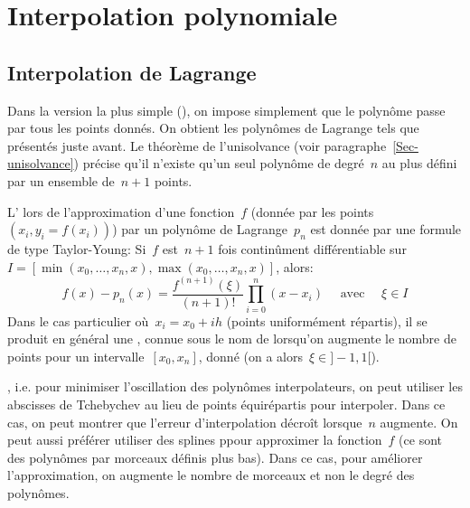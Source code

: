 \section{Interpolation polynomiale} 
\subsection{Interpolation de Lagrange} 
Dans la version la plus simple (), on impose simplement que le polynôme passe par tous les points donnés. On obtient les polynômes de Lagrange tels que présentés juste avant.  Le théorème de l'unisolvance (voir paragraphe~\ref{Sec-unisolvance}) précise qu'il n'existe qu'un seul polynôme de degré~$n$ au plus défini par un ensemble de~$n+1$ points. 

L' lors de l'approximation d'une fonction~$f$ (donnée par les points~$(x_i,y_i=f(x_i))$) par un polynôme de Lagrange~$p_n$ est donnée par une formule de type Taylor-Young: Si~$f$ est~$n+1$ fois continûment différentiable sur~$I=[\min(x_0,\ldots,x_n,x),\max(x_0,\ldots,x_n,x)]$, alors:
\begin{equation}
f(x) - p_n(x) = \frac{f^{(n+1)}(\xi)}{(n+1)!} \prod_{i=0}^n (x-x_i) \quad \text{ avec }\quad \xi \in I
\end{equation}
Dans le cas particulier où~$x_i = x_0 + ih$ (points uniformément répartis), il se produit en général une , connue sous le nom de  lorsqu'on augmente le nombre de points pour un intervalle~$[x_0,x_n]$, donné (on a alors~$\xi\in]-1,1[$). 

, i.e. pour minimiser l'oscillation des polynômes interpolateurs, on peut utiliser les abscisses de Tchebychev au lieu de points équirépartis pour interpoler. Dans ce cas, on peut montrer que l'erreur d'interpolation décroît lorsque~$n$ augmente. On peut aussi préférer utiliser des splines ppour approximer la fonction~$f$ (ce sont des polynômes par morceaux définis plus bas). Dans ce cas, pour améliorer l'approximation, on augmente le nombre de morceaux et non le degré des polynômes. 
 
